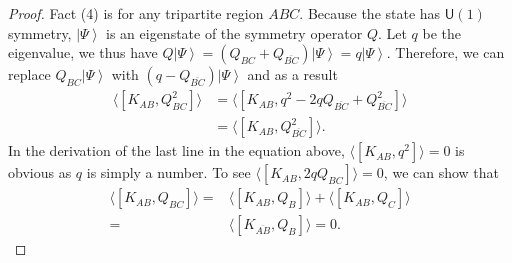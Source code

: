 \documentclass[10pt,a4paper]{amsart}
\def\gU{\textsf{U}}
\def\ket#1{\left|#1\right\rangle}
\begin{document}
\begin{proof}
    Fact (4) is for any tripartite region $ABC$. Because the state has $\gU(1)$ symmetry, $\ket\Psi$ is an eigenstate of the symmetry operator $Q$. Let $q$ be the eigenvalue, we thus have $Q\ket{\Psi} = (Q_{BC}+Q_{\overline{BC}})\ket{\Psi} = q \ket\Psi$. Therefore, we can replace $Q_{BC}\ket\Psi$ with $(q-Q_{\overline{BC}})\ket\Psi$ and as a result 
    \begin{equation}\begin{split}
        \langle [K_{AB},Q_{BC}^2] \rangle &= \langle [K_{AB},q^2-2q Q_{\overline{BC}} + Q_{\overline{BC}}^2]\rangle \\ 
        &= \langle [K_{AB}, Q_{\overline{BC}}^2]\rangle. 
    \end{split}
    \end{equation}
    In the derivation of the last line in the equation above, $\langle [K_{AB},q^2]\rangle = 0$ is obvious as $q$ is simply a number. To see $\langle [K_{AB},2q Q_{BC}]\rangle = 0$, we can show that 
    \begin{equation}\begin{split}
        \langle [K_{AB},Q_{BC}]\rangle =& \langle [K_{AB},Q_{B}]\rangle + \langle [K_{AB},Q_{C}]\rangle  \\ 
        =& \langle [K_{\overline{AB}},Q_{B}]\rangle = 0. 
    \end{split}
    \end{equation} 
\end{proof}
\end{document}
